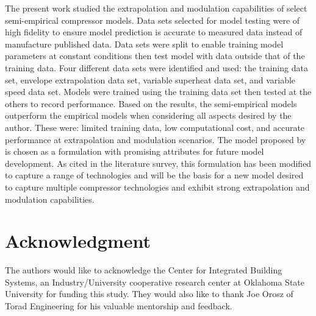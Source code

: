 \documentclass[preprint,11pt,authoryear]{elsarticle}
\begin{document}
The present work studied the extrapolation and modulation capabilities of select semi-empirical compressor models. Data sets selected for model testing were of high fidelity to ensure model prediction is accurate to measured data instead of manufacture published data. Data sets were split to enable training model parameters at constant conditions then test model with data outside that of the training data. Four different data sets were identified and used: the training data set, envelope extrapolation data set, variable superheat data set, and variable speed data set. Models were trained using the training data set then tested at the others to record performance. Based on the results, the semi-empirical models outperform the empirical models when considering all aspects desired by the author. These were: limited training data, low computational cost, and accurate performance at extrapolation and modulation scenarios. The model proposed by \cite{Winandy_recip} is chosen as a formulation with promising attributes for future model development. As cited in the literature survey, this formulation has been modified to capture a range of technologies and will be the basis for a new model desired to capture multiple compressor technologies and exhibit strong extrapolation and modulation capabilities.

\section{Acknowledgment}
The authors would like to acknowledge the Center for Integrated Building Systems, an Industry/University cooperative research center at Oklahoma State University for funding this study. They would also like to thank Joe Orosz of Torad Engineering for his valuable mentorship and feedback.

\newpage
\FloatBarrier




\newpage
\appendix
\end{document}

